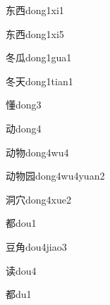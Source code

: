 \begin{verbete}[5;6]{东西}{dong1xi1}
\end{verbete}

\begin{verbete}[5;6]{东西}{dong1xi5}
\end{verbete}

\begin{verbete}[5;5]{冬瓜}{dong1gua1}
\end{verbete}

\begin{verbete}[5;4]{冬天}{dong1tian1}
\end{verbete}

\begin{verbete}[15]{懂}{dong3}
\end{verbete}

\begin{verbete}[6]{动}{dong4}
\end{verbete}

\begin{verbete}[6;8]{动物}{dong4wu4}
\end{verbete}

\begin{verbete}[6;8;7]{动物园}{dong4wu4yuan2}
\end{verbete}

\begin{verbete}[9;5]{洞穴}{dong4xue2}
\end{verbete}

\begin{verbete}[10]{都}{dou1}
\end{verbete}

\begin{verbete}[7;7]{豆角}{dou4jiao3}
\end{verbete}

\begin{verbete}[10]{读}{dou4}
\end{verbete}

\begin{verbete}[10]{都}{du1}
\end{verbete}

